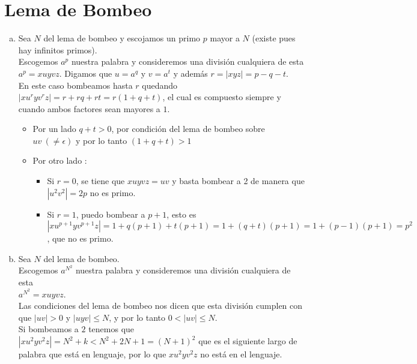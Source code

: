 \documentclass[dcc]{fcfmcourse}
\begin{document}
\section*{Lema de Bombeo}
\begin{problems}
\problem 
\begin{enumerate}[a)]
\item Sea $N$ del lema de bombeo y escojamos un primo $p$ mayor a $N$ (existe pues hay infinitos primos).\\
Escogemos $a^p$ nuestra palabra y consideremos una división cualquiera de esta $a^p=xuyvz$. Digamos que $u = a^q$ y $v= a^t$ y además $r = |xyz| = p-q-t$.\\

En este caso bombeamos hasta $r$ quedando $|xu^ryv^rz| = r + rq + rt = r(1+q+t)$, el cual es compuesto siempre y cuando ambos factores sean mayores a $1$.
\begin{itemize}
\item Por un lado $q+t > 0$, por condición del lema de bombeo sobre $uv\ (\not = \epsilon)$ y por lo tanto $(1+q+t) > 1$
\item Por otro lado :
\begin{itemize}
\item Si $r=0$, se tiene que $xuyvz = uv$ y basta bombear a 2 de manera que $|u^2v^2| = 2p$ no es primo.
\item Si $r=1$, puedo bombear a $p+1$, esto es $|xu^{p+1}yv^{p+1}z| = 1+q(p+1)+t(p+1) = 1 + (q+t)(p+1) = 1 + (p-1)(p+1) = p^2$, que no es primo.
\end{itemize}
\end{itemize}
\newpage
\item Sea $N$ del lema de bombeo.\\
Escogemos $a^{N^2}$ nuestra palabra y consideremos una división cualquiera de esta \\$a^{N^2}=xuyvz$.\\
Las condiciones del lema de bombeo nos dicen que esta división cumplen con que $|uv|>0$ y $|uyv|\le N$, y por lo tanto $0<|uv|\le N$.\\
Si bombeamos a $2$ tenemos que $|xu^2yv^2z| = N^2 + k < N^2 + 2N + 1 = (N+1)^2$ que es el siguiente largo de palabra que está en lenguaje, por lo que $xu^2yv^2z$ no está en el lenguaje.
\end{enumerate}
\end{problems}
\end{document}
